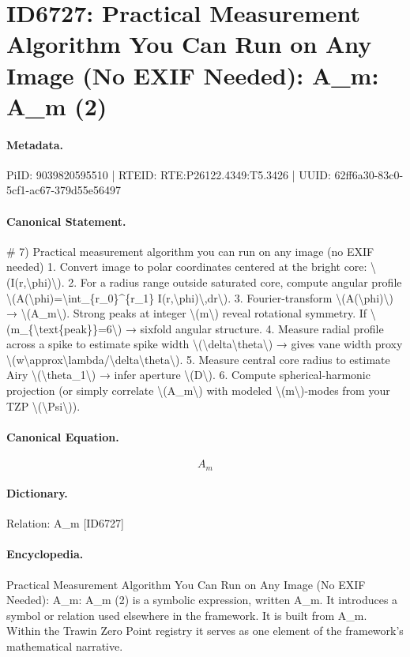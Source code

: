 \section*{ID6727: Practical Measurement Algorithm You Can Run on Any Image (No EXIF Needed): A\_m: A\_m (2)}
\paragraph{Metadata.}
PiID: 9039820595510 | RTEID: RTE:P26122.4349:T5.3426 | UUID: 62ff6a30-83c0-5cf1-ac67-379d55e56497

\paragraph{Canonical Statement.}
\# 7) Practical measurement algorithm you can run on any image (no EXIF needed) 1. Convert image to polar coordinates centered at the bright core: \textbackslash{}(I(r,\textbackslash{}phi)\textbackslash{}). 2. For a radius range outside saturated core, compute angular profile \textbackslash{}(A(\textbackslash{}phi)=\textbackslash{}int\_\{r\_0\}\textasciicircum{}\{r\_1\} I(r,\textbackslash{}phi)\textbackslash{},dr\textbackslash{}). 3. Fourier-transform \textbackslash{}(A(\textbackslash{}phi)\textbackslash{}) → \textbackslash{}(A\_m\textbackslash{}). Strong peaks at integer \textbackslash{}(m\textbackslash{}) reveal rotational symmetry. If \textbackslash{}(m\_\{\textbackslash{}text\{peak\}\}=6\textbackslash{}) → sixfold angular structure. 4. Measure radial profile across a spike to estimate spike width \textbackslash{}(\textbackslash{}delta\textbackslash{}theta\textbackslash{}) → gives vane width proxy \textbackslash{}(w\textbackslash{}approx\textbackslash{}lambda/\textbackslash{}delta\textbackslash{}theta\textbackslash{}). 5. Measure central core radius to estimate Airy \textbackslash{}(\textbackslash{}theta\_1\textbackslash{}) → infer aperture \textbackslash{}(D\textbackslash{}). 6. Compute spherical-harmonic projection (or simply correlate \textbackslash{}(A\_m\textbackslash{}) with modeled \textbackslash{}(m\textbackslash{})-modes from your TZP \textbackslash{}(\textbackslash{}Psi\textbackslash{})).

\paragraph{Canonical Equation.}
\[
A_m
\]

\paragraph{Dictionary.}
Relation: A\_m [ID6727]

\paragraph{Encyclopedia.}
Practical Measurement Algorithm You Can Run on Any Image (No EXIF Needed): A\_m: A\_m (2) is a symbolic expression, written A\_m. It introduces a symbol or relation used elsewhere in the framework. It is built from A\_m. Within the Trawin Zero Point registry it serves as one element of the framework's mathematical narrative.
